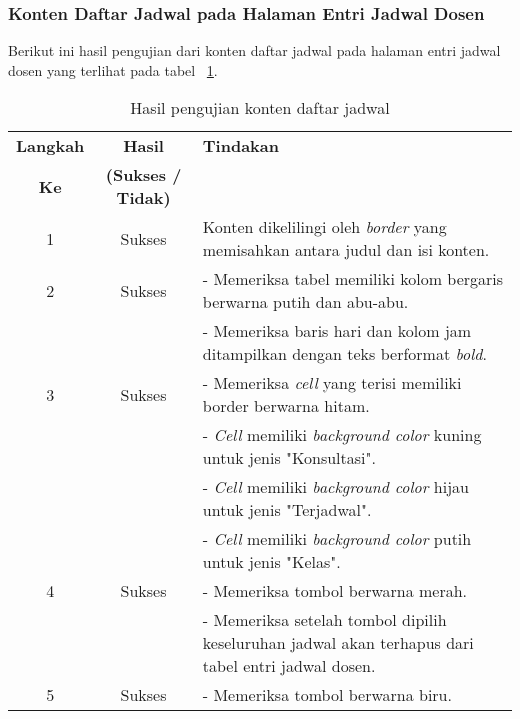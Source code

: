 \subsubsection{Konten Daftar Jadwal pada Halaman Entri Jadwal Dosen}
Berikut ini hasil pengujian dari konten daftar jadwal pada halaman entri jadwal dosen yang terlihat pada tabel ~\ref{hasil:DaftarJadwalEntri}.
\begin{table}[H]
	\centering 
	\caption{Hasil pengujian konten daftar jadwal}
	\label{hasil:DaftarJadwalEntri}
	\begin{tabular}{|c| c| p{}|}
		\toprule
		\textbf{Langkah} & \textbf{Hasil} & \textbf{Tindakan}\\
		\textbf{Ke} & \textbf{(Sukses / Tidak)} &\\
		\midrule
		1&Sukses&Konten dikelilingi oleh \textit{border} yang memisahkan antara judul dan isi konten.\\
		\hline
		2&Sukses&- Memeriksa tabel memiliki kolom bergaris berwarna putih dan abu-abu.\\
		&& - Memeriksa baris hari dan kolom jam ditampilkan dengan teks berformat \textit{bold}.	\\	
		\hline
		3&Sukses&- Memeriksa \textit{cell} yang terisi memiliki border berwarna hitam.\\
		&& - \textit{Cell} memiliki \textit{background color} kuning untuk jenis "Konsultasi". \\
		&& - \textit{Cell} memiliki \textit{background color} hijau untuk jenis "Terjadwal". \\
		&& - \textit{Cell} memiliki \textit{background color} putih untuk jenis "Kelas". \\
		\hline
		4&Sukses&- Memeriksa tombol berwarna merah.\\
		&& - Memeriksa setelah tombol dipilih keseluruhan jadwal akan terhapus dari tabel entri jadwal dosen.\\
		5& Sukses & - Memeriksa tombol berwarna biru.\\
		\bottomrule		
	\end{tabular} 
\end{table}

